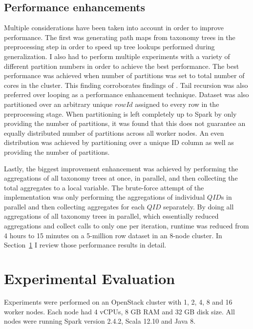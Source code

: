\documentclass[11pt]{article}       %
\newcommand{\includeFig}[3]      {\begin{figure}[htb] \begin{center}
                                 \includegraphics
                                 [width=4in,keepaspectratio] %
                                 {#2}\caption{\label{#1}#3} \end{center} \end{figure}}
\begin{document}
\subsection{Performance enhancements}

Multiple considerations have been taken into account in order to improve performance. The first was generating path maps from taxonomy trees in the preprocessing step in order to speed up tree lookups performed during generalization. I also had to perform multiple experiments with a variety of different partition numbers in order to achieve the best performance. The best performance was achieved when number of partitions was set to total number of cores in the cluster. This finding corroborates findings of \cite{Sopaoglu:2017}. Tail recursion was also preferred over looping as a performance enhancement technique. Dataset was also partitioned over an arbitrary unique $rowId$ assigned to every row in the preprocessing stage. When partitioning is left completely up to Spark by only providing the number of partitions, it was found that this does not guarantee an equally distributed number of partitions across all worker nodes. An even distribution was achieved by partitioning over a unique ID column as well as providing the number of partitions.

Lastly, the biggest improvement enhancement was achieved by performing the aggregations of all taxonomy trees at once, in parallel, and then collecting the total aggregates to a local variable. The brute-force attempt of the implementation was only performing the aggregations of individual $QID$s in parallel and then collecting aggregates for each $QID$ separately. By doing all aggregations of all taxonomy trees in parallel, which essentially reduced aggregations and collect calls to only one per iteration, runtime was reduced from 4 hours to 15 minutes on a 5-million row dataset in an 8-node cluster. In Section~\ref{evaluation} I review those performance results in detail.


\section{Experimental Evaluation} \label{evaluation}

Experiments were performed on an OpenStack cluster with 1, 2, 4, 8 and 16 worker nodes. Each node had 4 vCPUs, 8 GB RAM and 32 GB disk size. All nodes were running Spark version 2.4.2, Scala 12.10 and Java 8.
\end{document}
